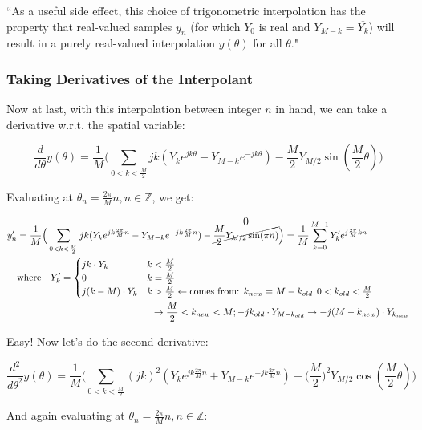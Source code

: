 \documentclass[10pt]{article}
\begin{document}
``As a useful side effect, this choice of trigonometric interpolation has the property that real-valued samples $y_n$ (for which $Y_0$ is real and $Y_{M-k} = \overline{Y_k}$) will result in a purely real-valued interpolation $y(\theta)$ for all $\theta$."

\subsubsection{Taking Derivatives of the Interpolant}

Now at last, with this interpolation between integer $n$ in hand, we can take a derivative w.r.t. the spatial variable:

$$\frac{d}{d\theta} y(\theta) = \frac{1}{M} \Big( \sum_{0 < k < \frac{M}{2}} j k (Y_k e^{j k \theta} - Y_{M-k} e^{-j k \theta}) - \frac{M}{2} Y_{M/2} \sin(\frac{M}{2}\theta) \Big)$$

Evaluating at $\theta_n = \frac{2\pi}{M}n, n \in \mathbb{Z}$, we get:\vspace{-5mm}

\begin{align*}
y'_n &= \frac{1}{M} \Big( \sum_{0 < k < \frac{M}{2}} j k (Y_k e^{j k \frac{2\pi}{M}n} - Y_{M-k} e^{-j k \frac{2\pi}{M}n}) - \overset{\text{\large 0}}{\cancel{\frac{M}{2} Y_{M/2} \sin(\pi n)}} \Big) = \frac{1}{M} \sum_{k = 0}^{M-1} Y'_k e^{j\frac{2\pi}{M}kn} \\
& \text{where} \quad Y'_k = \begin{cases} j k \cdot Y_k & k < \frac{M}{2} \\ 0 & k = \frac{M}{2} \\ j(k - M) \cdot Y_k & k > \frac{M}{2} \leftarrow \text{comes from: } k_{new} = M - k_{old}, 0 < k_{old} < \frac{M}{2} \end{cases}\\ & \hspace{5cm} \rightarrow \frac{M}{2} < k_{new} < M; -jk_{old} \cdot Y_{M - k_{old}} \rightarrow -j(M - k_{new}) \cdot Y_{k_{new}}
\end{align*}

Easy! Now let's do the second derivative:

$$\frac{d^2}{d\theta^2} y(\theta) = \frac{1}{M} \Big( \sum_{0 < k < \frac{M}{2}} (jk)^2 (Y_k e^{j k \frac{2\pi}{M}n} + Y_{M-k} e^{-j k \frac{2\pi}{M}n}) - \Big(\frac{M}{2}\Big)^2 Y_{M/2} \cos(\frac{M}{2}\theta) \Big)$$

And again evaluating at $\theta_n = \frac{2\pi}{M}n, n \in \mathbb{Z}$:\vspace{-5mm}
\end{document}
